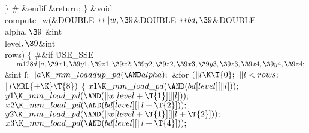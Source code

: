\4${}\}{}$\2\2\6
$\#$ \&{endif} \&{return}; $\}$ \&{void} \\{compute\_w}(\&{DOUBLE} ${}{*}{*}%
\|w,\39{}$\&{DOUBLE} ${}{*}{*}\\{bd},\39{}$\&{DOUBLE} \\{alpha}${},\39{}$%
\&{int} \\{level}${},\39{}$\&{int} \\{rows})\1\1 $\{{}$\6
\8\#\&{if} \.{USE\_SSE}\6
$\\{\_\_m128d}\|a,\39\\{x1},\39\\{y1},\39\\{z1},\39\\{x2},\39\\{y2},\39\\{z2},%
\39\\{x3},\39\\{y3},\39\\{z3},\39\\{x4},\39\\{y4},\39\\{z4};{}$\7
\&{int} \|l;\7
${}\|a\K\\{\_mm\_loaddup\_pd}({\AND}\\{alpha});{}$\6
\&{for} ${}(\|l\K\T{0};{}$ ${}\|l<\\{rows};{}$ ${}\|l\MRL{+{\K}}\T{8}){}$\5
${}\{{}$\1\6
${}\\{x1}\K\\{\_mm\_load\_pd}({\AND}(\\{bd}[\\{level}][\|l]));{}$\6
${}\\{y1}\K\\{\_mm\_load\_pd}({\AND}(\|w[\\{level}+\T{1}][\|l]));{}$\6
${}\\{x2}\K\\{\_mm\_load\_pd}({\AND}(\\{bd}[\\{level}][\|l+\T{2}]));{}$\6
${}\\{y2}\K\\{\_mm\_load\_pd}({\AND}(\|w[\\{level}+\T{1}][\|l+\T{2}]));{}$\6
${}\\{x3}\K\\{\_mm\_load\_pd}({\AND}(\\{bd}[\\{level}][\|l+\T{4}]));{}$\6
